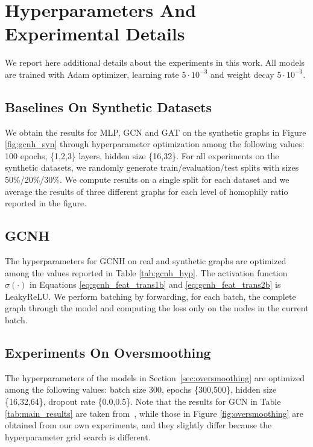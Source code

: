 \documentclass[conference]{IEEEtran}
\begin{document}
\section{Hyperparameters And Experimental Details}
\label{app:hyp}
We report here additional details about the experiments in this work. All models are trained with Adam optimizer, learning rate $5\cdot10^{-3}$ and weight decay $5\cdot10^{-3}$. 
\subsection{Baselines On Synthetic Datasets}
\label{app:baselines_syn_hyp}
We obtain the results for MLP, GCN and GAT on the synthetic graphs in Figure \ref{fig:gcnh_syn} through hyperparameter optimization among the following values: 100 epochs, \{1,2,3\} layers, hidden size \{16,32\}. For all experiments on the synthetic datasets, we randomly generate train/evaluation/test splits with sizes 50\%/20\%/30\%. We compute results on a single split for each dataset and we average the results of three different graphs for each level of homophily ratio reported in the figure.
\subsection{GCNH}
\label{app:gcnh_hyp}
The hyperparameters for GCNH on real and synthetic graphs are optimized among the values reported in Table \ref{tab:gcnh_hyp}. The activation function $\sigma(\cdot)$ in Equations \ref{eq:gcnh_feat_trans1b} and \ref{eq:gcnh_feat_trans2b} is LeakyReLU. We perform batching by forwarding, for each batch, the complete graph through the model and computing the loss only on the nodes in the current batch.

\subsection{Experiments On Oversmoothing}\label{app:sec:oversmoothing}
The hyperparameters of the models in Section~\ref{sec:oversmoothing} are optimized among the following values: batch size 300, epochs \{300,500\}, hidden size \{16,32,64\}, dropout rate \{0.0,0.5\}. Note that the results for GCN in Table \ref{tab:main_results} are taken from~\cite{yan_two_2021}, while those in Figure \ref{fig:oversmoothing} are obtained from our own experiments, and they slightly differ because the hyperparameter grid search is different.
\end{document}
